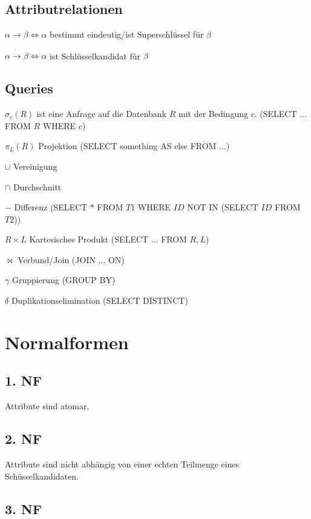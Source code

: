 \documentclass[10pt,a4paper,oneside]{report}
\begin{document}
\subsection*{Attributrelationen}

$\alpha \rightarrow \beta \Leftrightarrow \alpha$ bestimmt eindeutig/ist Superschlüssel für $\beta$

$\alpha \dot{\rightarrow} \beta \Leftrightarrow \alpha$ ist Schlüsselkandidat für $\beta$

\subsection*{Queries}

$\sigma_c(R)$ ist eine Anfrage auf die Datenbank $R$ mit der Bedingung $c$. (SELECT ... FROM $R$ WHERE $c$)

$\pi_L(R)$ Projektion (SELECT something AS else FROM ...)

$\cup$ Vereinigung

$\cap$ Durchschnitt

$-$ Differenz (SELECT $*$ FROM $T1$ WHERE $ID$ NOT IN (SELECT $ID$ FROM $T2$))

$R \times L$ Kartesisches Produkt (SELECT ... FROM $R, L$)

$\bowtie$ Verbund/Join (JOIN ... ON)

$\gamma$ Gruppierung (GROUP BY)

$\delta$ Duplikationselimination (SELECT DISTINCT)

\section*{Normalformen}

\subsection*{1. NF}

Attribute sind atomar.

\subsection*{2. NF}

Attribute sind nicht abhängig von einer echten Teilmenge eines Schüsselkandidaten.

\subsection*{3. NF}
\end{document}
